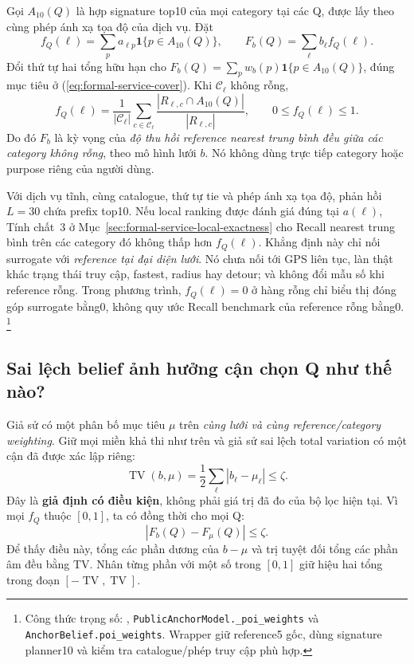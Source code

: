 Gọi $A_{10}(Q)$ là hợp signature top10 của mọi category tại các Q,
được lấy theo cùng phép ánh xạ tọa độ của dịch vụ. Đặt
\begin{equation}
 f_Q(\ell)=\sum_p a_{\ell p}\mathbf1\{p\in A_{10}(Q)\},
 \qquad F_b(Q)=\sum_\ell b_\ell f_Q(\ell).
 \label{eq:formal-belief-expected-cover}
\end{equation}
Đổi thứ tự hai tổng hữu hạn cho
$F_b(Q)=\sum_p w_b(p)\mathbf1\{p\in A_{10}(Q)\}$, đúng mục tiêu ở
(\ref{eq:formal-service-cover}). Khi $\mathcal C_\ell$ không rỗng,
\begin{equation}
 f_Q(\ell)=\frac{1}{|\mathcal C_\ell|}
 \sum_{c\in\mathcal C_\ell}
 \frac{|R_{\ell,c}\cap A_{10}(Q)|}{|R_{\ell,c}|},
 \qquad 0\leq f_Q(\ell)\leq1.
 \label{eq:formal-belief-category-recall}
\end{equation}
Do đó $F_b$ là kỳ vọng của \emph{độ thu hồi reference nearest trung bình
đều giữa các category không rỗng}, theo mô hình lưới $b$. Nó không dùng
trực tiếp category hoặc purpose riêng của người dùng.

Với dịch vụ tĩnh, cùng catalogue, thứ tự tie và phép ánh xạ tọa độ,
phản hồi $L=30$ chứa prefix top10. Nếu local ranking được đánh giá đúng
tại $a(\ell)$, Tính chất~3 ở Mục~\ref{sec:formal-service-local-exactness}
cho Recall nearest trung bình trên các category đó không thấp hơn
$f_Q(\ell)$. Khẳng định này chỉ nối surrogate với \emph{reference tại
đại diện lưới}. Nó chưa nối tới GPS liên tục, làn thật khác trạng thái
truy cập, fastest, radius hay detour; và không đổi mẫu số khi reference
rỗng. Trong phương trình, $f_Q(\ell)=0$ ở hàng rỗng chỉ biểu thị đóng góp
surrogate bằng0, không quy ước Recall benchmark của reference rỗng bằng0.
\footnote{Công thức trọng số: ,
\texttt{PublicAnchorModel.\_poi\_weights} và
\texttt{AnchorBelief.poi\_weights}. Wrapper
 giữ reference5 gốc, dùng
signature planner10 và kiểm tra catalogue/phép truy cập phù hợp.}

\subsection{Sai lệch belief ảnh hưởng cận chọn Q như thế nào?}

Giả sử có một phân bố mục tiêu $\mu$ trên \emph{cùng lưới và cùng
reference/category weighting}. Giữ mọi miền khả thi như trên và giả
sử sai lệch total variation có một cận đã được xác lập riêng:
\begin{equation}
 \operatorname{TV}(b,\mu)=\frac12\sum_\ell|b_\ell-\mu_\ell|
 \leq\zeta.
 \label{eq:formal-belief-calibration-assumption}
\end{equation}
Đây là \textbf{giả định có điều kiện}, không phải giá trị đã đo của bộ
lọc hiện tại. Vì mọi $f_Q$ thuộc $[0,1]$, ta có đồng thời cho mọi Q:
\begin{equation}
 |F_b(Q)-F_\mu(Q)|\leq\zeta.
 \label{eq:formal-belief-expectation-error}
\end{equation}
Để thấy điều này, tổng các phần dương của $b-\mu$ và trị tuyệt đối tổng
các phần âm đều bằng TV. Nhân từng phần với một số trong $[0,1]$ giữ
hiệu hai tổng trong đoạn $[-\operatorname{TV},\operatorname{TV}]$.

